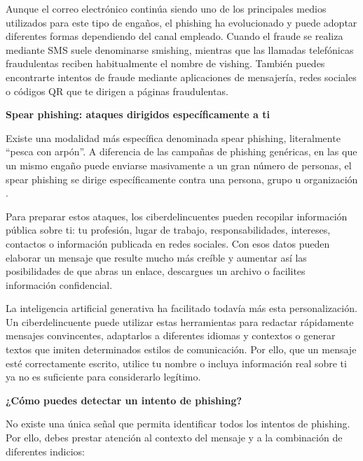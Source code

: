 \documentclass[
  spanish,
  a4paper,
  openany]{book}
\begin{document}
Aunque el correo electrónico continúa siendo uno de los principales medios utilizados para este tipo de engaños, el phishing ha evolucionado y puede adoptar diferentes formas dependiendo del canal empleado. Cuando el fraude se realiza mediante SMS suele denominarse smishing, mientras que las llamadas telefónicas fraudulentas reciben habitualmente el nombre de vishing. También puedes encontrarte intentos de fraude mediante aplicaciones de mensajería, redes sociales o códigos QR que te dirigen a páginas fraudulentas.

\textbf{Spear phishing: ataques dirigidos específicamente a ti}

Existe una modalidad más específica denominada spear phishing, literalmente ``pesca con arpón''. A diferencia de las campañas de phishing genéricas, en las que un mismo engaño puede enviarse masivamente a un gran número de personas, el spear phishing se dirige específicamente contra una persona, grupo u organización \citep{PROOFPOINT-spear-phishing}.

Para preparar estos ataques, los ciberdelincuentes pueden recopilar información pública sobre ti: tu profesión, lugar de trabajo, responsabilidades, intereses, contactos o información publicada en redes sociales. Con esos datos pueden elaborar un mensaje que resulte mucho más creíble y aumentar así las posibilidades de que abras un enlace, descargues un archivo o facilites información confidencial.

La inteligencia artificial generativa ha facilitado todavía más esta personalización. Un ciberdelincuente puede utilizar estas herramientas para redactar rápidamente mensajes convincentes, adaptarlos a diferentes idiomas y contextos o generar textos que imiten determinados estilos de comunicación. Por ello, que un mensaje esté correctamente escrito, utilice tu nombre o incluya información real sobre ti ya no es suficiente para considerarlo legítimo.

\textbf{¿Cómo puedes detectar un intento de phishing?}

No existe una única señal que permita identificar todos los intentos de phishing. Por ello, debes prestar atención al contexto del mensaje y a la combinación de diferentes indicios:
\end{document}
